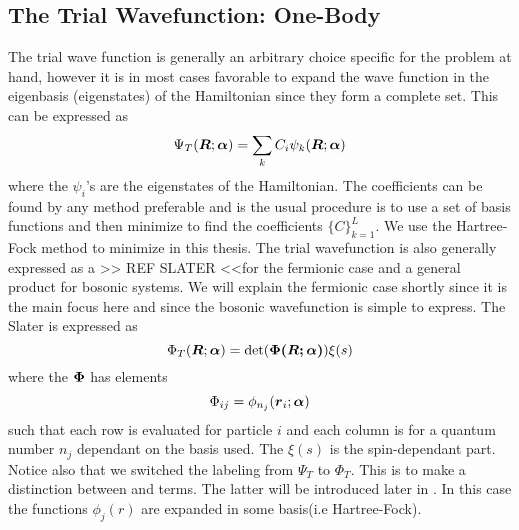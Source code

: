     \subsection{The Trial Wavefunction: One-Body}
        The trial wave function is generally an arbitrary choice specific for
        the problem at hand, however it is in most cases favorable to expand
        the wave function in the eigenbasis (eigenstates) of the Hamiltonian
        since they form a complete set. This can be expressed as
            \begin{equation}
                {\Psi}_T(\boldsymbol{{R}};\boldsymbol{{\alpha}}) = \sum_k C_i\psi_k(\boldsymbol{{R}};\boldsymbol{{\alpha}})
            \end{equation}
        where the $\psi_i$'s are the eigenstates of the Hamiltonian. The
        coefficients can be found by any method preferable and is the usual
        procedure is to use a set of basis functions and then minimize to find
        the coefficients $\{C\}_{k=1}^L$. We use the Hartree-Fock method to
        minimize in this thesis. The trial wavefunction is also generally
        expressed as a  >> REF SLATER <<for the
        fermionic case and a general product for bosonic systems. We will
        explain the fermionic case shortly since it is the main focus here and
        since the bosonic wavefunction is simple to express. The Slater is
        expressed as
            \begin{equation}
                {\Phi}_T(\boldsymbol{{R}};\boldsymbol{{\alpha}}) = \det(\boldsymbol{{\Phi(\boldsymbol{{R}};\boldsymbol{{\alpha}})}}) \xi(s)
            \end{equation}
        where the  $\boldsymbol{{\Phi}}$ has elements
            \begin{equation}
                \Phi_{ij} = \phi_{n_j}(\boldsymbol{{r}}_i;\boldsymbol{{\alpha}})
            \end{equation}
        such that each row is evaluated for particle $i$ and each column is for
        a quantum number $n_j$ dependant on the basis used. The $\xi(s)$ is the
        spin-dependant part. Notice also that we switched the labeling from
        $\Psi_T$ to $\Phi_T$. This is to make a distinction between
         and  terms. The latter will be
        introduced later in . In this case the
         functions $\phi_j(r)$ are expanded in some
        basis(i.e Hartree-Fock).

